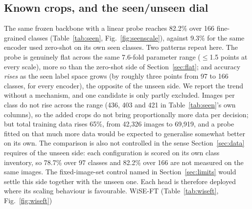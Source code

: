 \documentclass[a4paper,fleqn]{cas-dc}
\begin{document}
\subsection{Known crops, and the seen/unseen dial}

The same frozen backbone with a linear probe reaches 82.2\% over 166 fine-grained classes
(Table~\ref{tab:seen}, Fig.~\ref{fig:seenscale}), against 9.3\% for the same encoder used zero-shot on its own seen classes.
Two patterns repeat here. The probe is genuinely flat across the same 7.6-fold parameter range
($\leq$1.5 points at every scale), more so than the zero-shot side of Section~\ref{sec:flat}; and
accuracy \emph{rises} as the seen label space grows (by roughly three points from 97 to 166
classes, for every encoder), the opposite of the unseen side. We report the trend without a mechanism, and one candidate is only partly excluded. Images per class do not rise across the range (436, 403 and 421 in Table~\ref{tab:seen}'s own columns), so the added crops do not bring proportionally more data per decision; but total training data rises 65\%, from 42,326 images to 69,919, and a probe fitted on that much more data would be expected to generalise somewhat better on its own. The comparison is also not controlled in the sense Section~\ref{sec:data} requires of the unseen side: each configuration is scored on its own class inventory, so 78.7\% over 97 classes and 82.2\% over 166 are not measured on the same images. The fixed-image-set control named in Section~\ref{sec:limits} would settle this side together with the unseen one. Each
head is therefore deployed where its scaling behaviour is favourable. WiSE-FT (Table~\ref{tab:wiseft}, Fig.~\ref{fig:wiseft})
\end{document}
